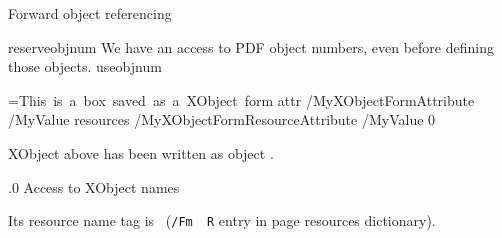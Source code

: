  {Forward object referencing}

\pdfobj reserveobjnum
We have an access to PDF object numbers, even before defining those objects.
\pdfobj useobjnum
\pdfrefobj\pdflastobj

\endfeature


=\hbox{This is a box saved as a XObject form}
\pdfxform
   attr      {/MyXObjectFormAttribute         /MyValue}
   resources {/MyXObjectFormResourceAttribute /MyValue}
   0


\hbox{\pdfrefxform \pdflastxform}


XObject above has been written as object \the\pdflastxform.

.0 {Access to XObject names}

Its resource name tag is \pdfxformname\pdflastxform\
({\tt/Fm\pdfxformname\pdflastxform\ \the\pdflastxform{} R}
entry in page resources dictionary).

\endfeature

\bigskip


